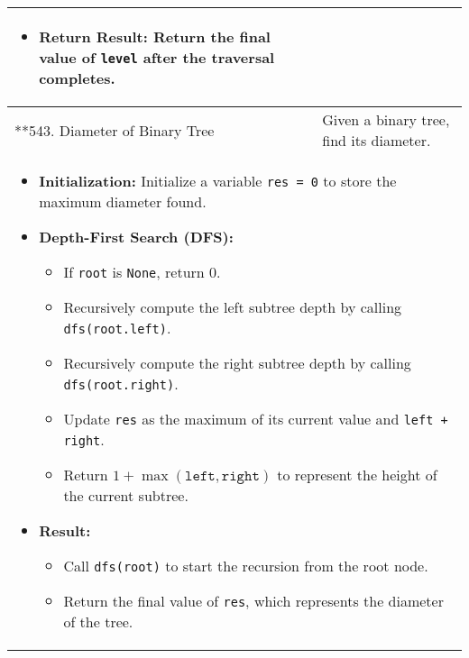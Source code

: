 \begin{summary}
\begin{center}
\begin{tabular}{ll}
{\begin{itemize}
\begin{itemize}
                        \item \textbf{Return Result:} Return the final value of \texttt{level} after the traversal completes.
                    \end{itemize}                              
                \end{itemize}
            } \\
            \midrule
            **543. Diameter of Binary Tree & Given a binary tree, find its diameter. \\
            \multicolumn{2}{p{\linewidth}}{
                \begin{itemize}
                    \item \textbf{Initialization:} Initialize a variable \texttt{res = 0} to store the maximum diameter found.
                
                    \item \textbf{Depth-First Search (DFS):} 
                    \begin{itemize}
                        \item If \texttt{root} is \texttt{None}, return $0$.
                        \item Recursively compute the left subtree depth by calling \texttt{dfs(root.left)}.
                        \item Recursively compute the right subtree depth by calling \texttt{dfs(root.right)}.
                        \item Update \texttt{res} as the maximum of its current value and \texttt{left + right}.
                        \item Return $1 + \max(\texttt{left}, \texttt{right})$ to represent the height of the current subtree.
                    \end{itemize}
                
                    \item \textbf{Result:}
                    \begin{itemize}
                        \item Call \texttt{dfs(root)} to start the recursion from the root node.
                        \item Return the final value of \texttt{res}, which represents the diameter of the tree.
                    \end{itemize}
                \end{itemize}                
            } \\
            \midrule


\end{tabular}
\end{center}
\end{summary}
